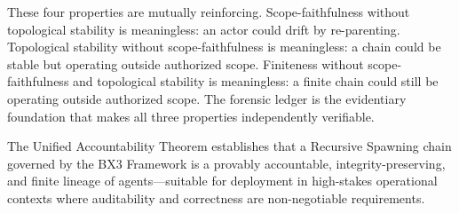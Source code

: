 These four properties are mutually reinforcing. Scope-faithfulness without topological stability is meaningless: an actor could drift by re-parenting. Topological stability without scope-faithfulness is meaningless: a chain could be stable but operating outside authorized scope. Finiteness without scope-faithfulness and topological stability is meaningless: a finite chain could still be operating outside authorized scope. The forensic ledger is the evidentiary foundation that makes all three properties independently verifiable.

The Unified Accountability Theorem establishes that a Recursive Spawning chain governed by the BX3 Framework is a provably accountable, integrity-preserving, and finite lineage of agents---suitable for deployment in high-stakes operational contexts where auditability and correctness are non-negotiable requirements.